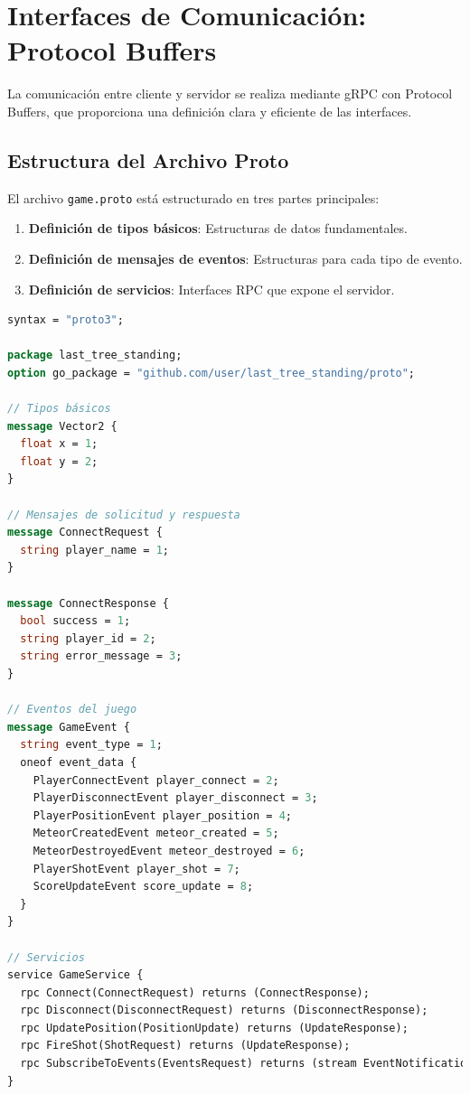 \documentclass[11pt,letterpaper]{article}
\begin{document}
\section{Interfaces de Comunicación: Protocol Buffers}

La comunicación entre cliente y servidor se realiza mediante gRPC con Protocol Buffers, que proporciona una definición clara y eficiente de las interfaces.

\subsection{Estructura del Archivo Proto}

El archivo \texttt{game.proto} está estructurado en tres partes principales:

\begin{enumerate}
    \item \textbf{Definición de tipos básicos}: Estructuras de datos fundamentales.
    \item \textbf{Definición de mensajes de eventos}: Estructuras para cada tipo de evento.
    \item \textbf{Definición de servicios}: Interfaces RPC que expone el servidor.
\end{enumerate}

\begin{lstlisting}[language=proto, caption=Estructura del archivo game.proto]
syntax = "proto3";

package last_tree_standing;
option go_package = "github.com/user/last_tree_standing/proto";

// Tipos básicos
message Vector2 {
  float x = 1;
  float y = 2;
}

// Mensajes de solicitud y respuesta
message ConnectRequest {
  string player_name = 1;
}

message ConnectResponse {
  bool success = 1;
  string player_id = 2;
  string error_message = 3;
}

// Eventos del juego
message GameEvent {
  string event_type = 1;
  oneof event_data {
    PlayerConnectEvent player_connect = 2;
    PlayerDisconnectEvent player_disconnect = 3;
    PlayerPositionEvent player_position = 4;
    MeteorCreatedEvent meteor_created = 5;
    MeteorDestroyedEvent meteor_destroyed = 6;
    PlayerShotEvent player_shot = 7;
    ScoreUpdateEvent score_update = 8;
  }
}

// Servicios
service GameService {
  rpc Connect(ConnectRequest) returns (ConnectResponse);
  rpc Disconnect(DisconnectRequest) returns (DisconnectResponse);
  rpc UpdatePosition(PositionUpdate) returns (UpdateResponse);
  rpc FireShot(ShotRequest) returns (UpdateResponse);
  rpc SubscribeToEvents(EventsRequest) returns (stream EventNotification);
}
\end{lstlisting}
\end{document}
